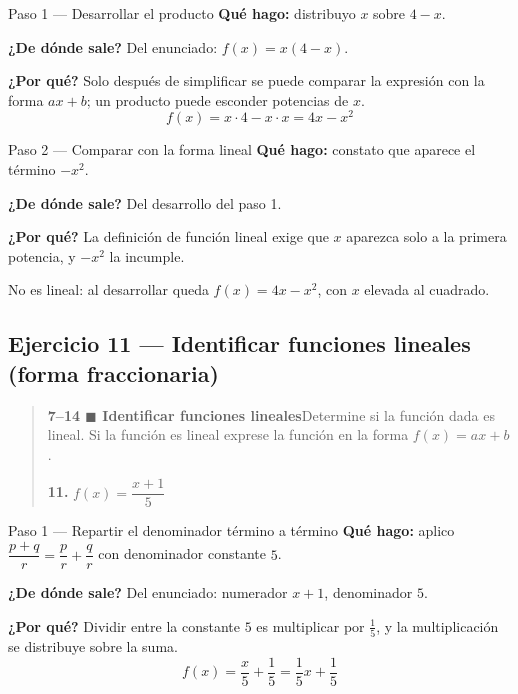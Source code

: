 \documentclass[11pt]{article}
\begin{document}
\begin{paso}{Paso 1 --- Desarrollar el producto}
\textbf{Qué hago:} distribuyo $x$ sobre $4-x$.

\textbf{¿De dónde sale?} Del enunciado: $f(x)=x(4-x)$.

\textbf{¿Por qué?} Solo después de simplificar se puede comparar la expresión con la forma $ax+b$; un producto puede esconder potencias de $x$.
\[
f(x)=x\cdot 4-x\cdot x=4x-x^2
\]
\end{paso}

\begin{paso}{Paso 2 --- Comparar con la forma lineal}
\textbf{Qué hago:} constato que aparece el término $-x^2$.

\textbf{¿De dónde sale?} Del desarrollo del paso 1.

\textbf{¿Por qué?} La definición de función lineal exige que $x$ aparezca solo a la primera potencia, y $-x^2$ la incumple.
\end{paso}

\begin{resp}
No es lineal: al desarrollar queda $f(x)=4x-x^2$, con $x$ elevada al cuadrado.
\end{resp}

\subsection*{Ejercicio 11 — Identificar funciones lineales (forma fraccionaria)}

\begin{quote}
\textbf{7--14 $\blacksquare$ Identificar funciones lineales}\quad Determine si la función dada es lineal. Si la función es lineal exprese la función en la forma $f(x)=ax+b$.

\textbf{11.} $f(x)=\dfrac{x+1}{5}$
\end{quote}

\begin{paso}{Paso 1 --- Repartir el denominador término a término}
\textbf{Qué hago:} aplico $\dfrac{p+q}{r}=\dfrac{p}{r}+\dfrac{q}{r}$ con denominador constante $5$.

\textbf{¿De dónde sale?} Del enunciado: numerador $x+1$, denominador $5$.

\textbf{¿Por qué?} Dividir entre la constante $5$ es multiplicar por $\tfrac15$, y la multiplicación se distribuye sobre la suma.
\[
f(x)=\frac{x}{5}+\frac{1}{5}=\frac15 x+\frac15
\]
\end{paso}
\end{document}
